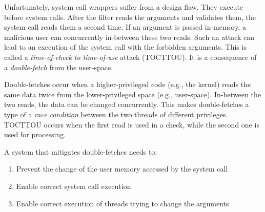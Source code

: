 

Unfortunately, system call wrappers suffer from a design flaw. They execute
before system calls. After the filter reads the arguments and validates them,
the system call reads them a second time. If an argument is passed in-memory, a
malicious user can concurrently in-between these two reads. Such an attack can
lead to an execution of the system call with the forbidden arguments. This is
called a \emph{time-of-check to time-of-use} attack (TOCTTOU). It is a
consequence of a \emph{double-fetch} from the user-space.


Double-fetches\cite{serna08doublefetch, twizsgrakky07ring0, wilhelm2016xenpwn,
wang2018survey} occur when a higher-privileged code (e.g., the kernel) reads the
same data twice from the lower-privileged space (e.g., user-space). In-between
the two reads, the data can be changed concurrently. This makes double-fetches a
type of a \emph{race condition} between the two threads of different privileges.
TOCTTOU occurs when the first read is used in a check, while the second one is
used for processing.


A system that mitigates double-fetches needs to:
\begin{enumerate}
  \item Prevent the change of the user memory accessed by the system call
  \item Enable correct system call execution
  \item Enable correct execution of threads trying to change the arguments
\end{enumerate}


